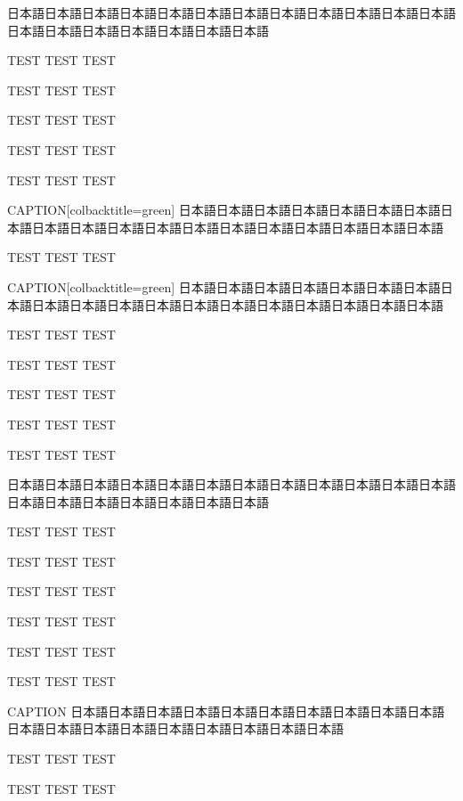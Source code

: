 \begin{rv@folderbox@nocaption}
日本語日本語日本語日本語日本語日本語日本語日本語日本語日本語日本語日本語日本語日本語日本語日本語日本語日本語日本語

TEST TEST TEST

TEST TEST TEST

TEST TEST TEST

TEST TEST TEST

TEST TEST TEST

\end{rv@folderbox@nocaption}

\clearpage

\begin{rv@clipbox@caption}{CAPTION}[colbacktitle=green]
日本語日本語日本語日本語日本語日本語日本語日本語日本語日本語日本語日本語日本語日本語日本語日本語日本語日本語日本語

TEST TEST TEST

\end{rv@clipbox@caption}

\begin{rv@clipbox@caption}{CAPTION}[colbacktitle=green]
日本語日本語日本語日本語日本語日本語日本語日本語日本語日本語日本語日本語日本語日本語日本語日本語日本語日本語日本語

TEST TEST TEST

TEST TEST TEST

TEST TEST TEST

TEST TEST TEST

TEST TEST TEST

\end{rv@clipbox@caption}

\begin{rv@clipbox@nocaption}
日本語日本語日本語日本語日本語日本語日本語日本語日本語日本語日本語日本語日本語日本語日本語日本語日本語日本語日本語

TEST TEST TEST

TEST TEST TEST

TEST TEST TEST

TEST TEST TEST

TEST TEST TEST

TEST TEST TEST

\end{rv@clipbox@nocaption}

\clearpage

\begin{rv@dottedbox@caption}{CAPTION}
日本語日本語日本語日本語日本語日本語日本語日本語日本語日本語日本語日本語日本語日本語日本語日本語日本語日本語日本語

TEST TEST TEST

TEST TEST TEST

\end{rv@dottedbox@caption}

